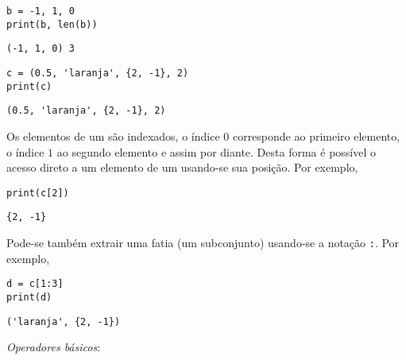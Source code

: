 \documentclass[12pt]{article}
\begin{document}
\begin{lstlisting}
b = -1, 1, 0
print(b, len(b))
\end{lstlisting}

\begin{verbatim}
(-1, 1, 0) 3
\end{verbatim}

\begin{lstlisting}
c = (0.5, 'laranja', {2, -1}, 2)
print(c)
\end{lstlisting}

\begin{verbatim}
(0.5, 'laranja', {2, -1}, 2)
\end{verbatim}

Os elementos de um {\PYTHONtuple} são indexados, o índice $0$ corresponde ao primeiro elemento, o índice $1$ ao segundo elemento e assim por diante. Desta forma é possível o acesso direto a um elemento de um {\PYTHONtuple} usando-se sua posição. Por exemplo,

\begin{lstlisting}
print(c[2])
\end{lstlisting}

\begin{verbatim}
{2, -1}
\end{verbatim}

Pode-se também extrair uma fatia (um subconjunto) usando-se a notação
\texttt{:}. Por exemplo,

\begin{lstlisting}
d = c[1:3]
print(d)
\end{lstlisting}

\begin{verbatim}
('laranja', {2, -1})
\end{verbatim}

\emph{Operadores básicos}:
\end{document}
